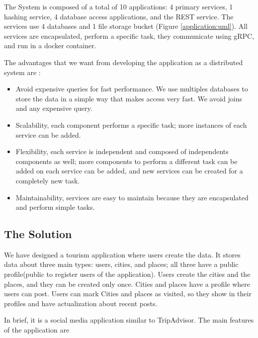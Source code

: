 The System is composed of a total of 10 applications: 4 primary services, 1 hashing service, 4 database access applications, and the REST service. The services use  4 databases and 1 file storage bucket (Figure \ref{application:uml}). All services are encapsulated, perform a specific task, they communicate using gRPC, and run in a docker container.

The advantages that we want from developing the application as a distributed system are \cite{dsbook}:

\begin{itemize}
	\item Avoid expensive queries for fast performance. We use multiples databases to store the data in a simple way that makes access very fast. We avoid joins and any expensive query.
	
	\item	Scalability, each component performs a specific task; more instances of each service can be added.
	
	\item	Flexibility, each service is independent and composed of independents components as well; more components to perform a different task can be added on each service can be added, and new services can be created for a completely new task.
	
	\item Maintainability, services are easy to maintain because they are encapsulated and perform simple tasks.
	
\end{itemize}



\subsection{The Solution}
\indent
\indent
We have designed a tourism application where users create the data.  It stores data about three main types: users, cities, and places; all three have a public profile(public to register users of the application). Users create the cities and the places, and they can be created only once. Cities and places have a profile where users can post. Users can mark Cities and places as visited, so they show in their profiles and have actualization about recent posts.

In brief, it is a social media application similar to TripAdvisor. The main features of the application are 

